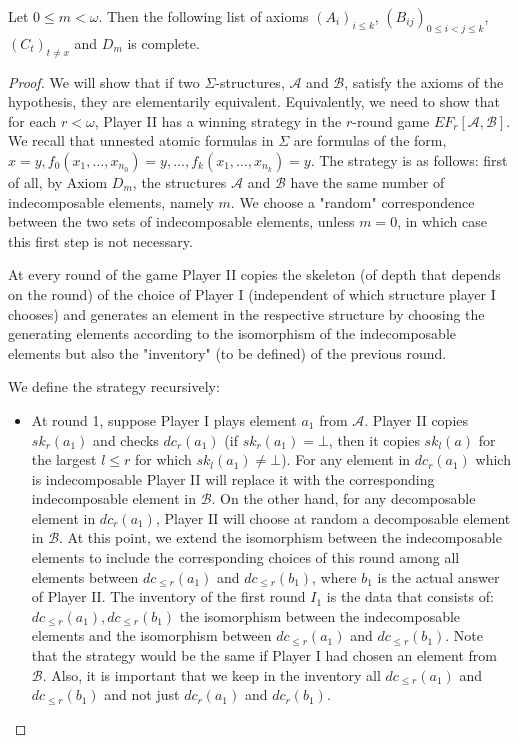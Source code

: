 \documentclass[a4paper,11pt]{article}
\begin{document}
\begin{theorem}\label{IndecomposableEquivalentElementary}
Let $0\leq m<\omega$. Then the following list of axioms $(A_i)_{i\leq k}$, $(B_{ij})_{0\leq i<j\leq k}$, $(C_t)_{t\neq x}$ and $D_m$ is complete. 
\end{theorem}
\begin{proof}
We will show that if two $\Sigma$-structures, $\mathcal{A}$ and $\mathcal{B}$, satisfy the axioms of the hypothesis, they are elementarily equivalent. Equivalently, we need to show that for each $r<\omega$, Player II has a winning strategy in the $r$-round game $EF_r[\mathcal{A}, \mathcal{B}]$. We recall that unnested atomic formulas in $\Sigma$ are formulas of the form, $x=y, f_0(x_1, \ldots, x_{n_0})=y, \ldots, f_k(x_1,\ldots, x_{n_k})=y$. The strategy is as follows: first of all, by Axiom $D_m$, the structures $\mathcal{A}$ and $\mathcal{B}$ have the same number of indecomposable elements, namely $m$. We choose a "random" correspondence between the two sets of indecomposable elements, unless $m=0$, in which case this first step is not necessary. 

At every round of the game Player II copies the skeleton (of depth that depends on the round) of the choice of Player I (independent of which structure player I chooses) and generates an element in the respective structure by choosing the generating elements according to the isomorphism of the indecomposable elements but also the "inventory" (to be defined) of the previous round.

We define the strategy recursively:
\begin{itemize}
\item At round 1, suppose Player I plays element $a_1$ from $\mathcal{A}$. Player II copies $sk_r(a_1)$ and checks $dc_r(a_1)$ (if $sk_r(a_1)=\bot$, then it copies $sk_l(a)$ for the largest $l\leq r$ for which $sk_l(a_1)\neq\bot$). For any element in $dc_r(a_1)$ which is indecomposable Player II will replace it with the corresponding indecomposable element in $\mathcal{B}$. On the other hand,  for any decomposable element in $dc_r(a_1)$, Player II will choose at random a decomposable element in $\mathcal{B}$. 
At this point, we extend the isomorphism between the indecomposable elements to include the corresponding choices of this round among all elements between $dc_{\leq r}(a_1)$ and $dc_{\leq r}(b_1)$, where $b_1$ is the actual answer of Player II. The inventory of the first round $I_1$ is the data that consists of: $dc_{\leq r}(a_1), dc_{\leq r}(b_1)$ the isomorphism between the indecomposable elements and the isomorphism between $dc_{\leq r}(a_1)$ and $ dc_{\leq r}(b_1)$. Note that the strategy would be the same if Player I had chosen an element from $\mathcal{B}$. Also, it is important that we keep in the inventory all $dc_{\leq r}(a_1)$ and $ dc_{\leq r}(b_1)$ and not just $dc_{r}(a_1)$ and $ dc_{r}(b_1)$.


\end{itemize}
\end{proof}
\end{document}

